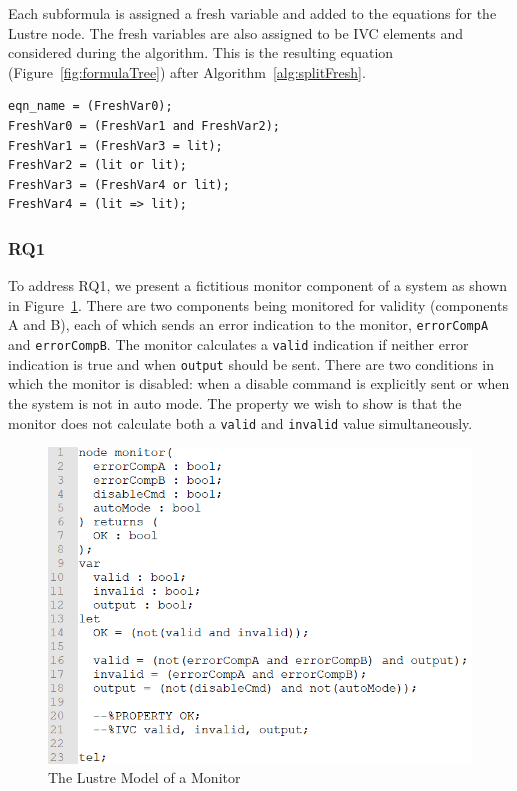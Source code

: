 Each subformula is assigned a fresh variable and added to the equations for the Lustre node. The fresh variables are also assigned to be IVC elements and considered during the \aivcalg algorithm. This is the resulting equation (Figure~\ref{fig:formulaTree}) after Algorithm~\ref{alg:splitFresh}.

\begin{verbatim}
eqn_name = (FreshVar0);
FreshVar0 = (FreshVar1 and FreshVar2);
FreshVar1 = (FreshVar3 = lit);
FreshVar2 = (lit or lit);
FreshVar3 = (FreshVar4 or lit);
FreshVar4 = (lit => lit);
\end{verbatim}

\subsubsection{RQ1}
To address RQ1, we present a fictitious monitor component of a system as shown in Figure~\ref{fig:monitorLustre}. There are two components being monitored for validity (components A and B), each of which sends an error indication to the monitor, \texttt{errorCompA} and \texttt{errorCompB}. The monitor calculates  a \texttt{valid} indication if neither error indication is true and when \texttt{output} should be sent. There are two conditions in which the monitor is disabled: when a disable command is explicitly sent or when the system is not in auto mode. The property we wish to show is that the monitor does not calculate both a \texttt{valid} and \texttt{invalid} value simultaneously. 
\begin{figure}[h!]
\begin{center}
\includegraphics[width=.8\textwidth]{images/monitorLustre.PNG}
\caption{The Lustre Model of a Monitor} 
\label{fig:monitorLustre}
\end{center}
\end{figure} 

